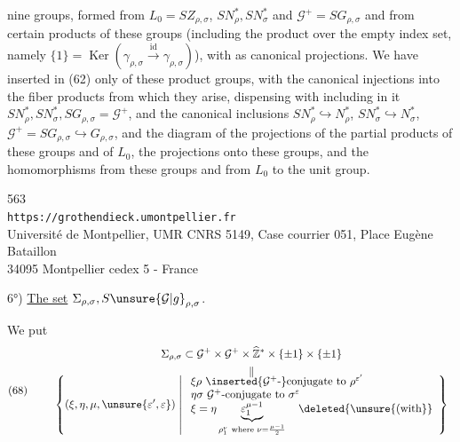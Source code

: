 
nine groups,  formed from $L_{0}=SZ_{\rho,\sigma}$, $SN_{\rho}^{*},SN_{\sigma}^{*}$ and $\mathcal{G}^{+}=SG_{\rho,\sigma}$ and from certain products of these groups (including the product over the empty index set, namely $\{1\}=\operatorname{Ker}(\gamma_{\rho,\sigma}\xrightarrow{\mathrm{id}}\gamma_{\rho,\sigma})$), with as  canonical projections. We have inserted in (62) only  of these product groups, with the canonical injections into the fiber products from which they arise,  dispensing with including in it  $SN_{\rho}^{*},SN_{\sigma}^{*},SG_{\rho,\sigma}=\mathcal{G}^{+}$, and the canonical inclusions $SN_{\rho}^{*}\hookrightarrow N_{\rho}^{*}$, $SN_{\sigma}^{*}\hookrightarrow N_{\sigma}^{*}$, $\mathcal{G}^{+}=SG_{\rho,\sigma}\hookrightarrow G_{\rho,\sigma}$, and the   diagram of the projections of the partial products of these groups and of $L_{0}$,   the projections onto these  groups, and the homomorphisms from these groups and from $L_{0}$ to the unit group.


{\small
\begin{center}
563\\
\texttt{https://grothendieck.umontpellier.fr}\\
Université de Montpellier, UMR CNRS 5149, Case courrier 051, Place Eugène Bataillon\\
34095 Montpellier cedex 5 - France
\end{center}
}


6°) \uline{The set} $\Sigma_{\rho,\sigma},S\unsure{\mathcal{G}|g}_{\rho,\sigma}$.

We put
\[
\text{(68)}\qquad
\begin{gathered}
\Sigma_{\rho,\sigma}\subset\mathcal{G}^{+}\times\mathcal{G}^{+}\times\widehat{\mathbb Z}^{*}\times\{\pm1\}\times\{\pm1\}\\
\begin{array}{c}
\Vert\\[-0.4em]
\displaystyle
\left\{(\xi,\eta,\mu,\unsure{\varepsilon',\varepsilon})\;\middle|\;
\begin{array}{l}
\xi\rho\ \inserted{\mathcal{G}^{+}\text{-}}\text{conjugate to }\rho^{\varepsilon'}\\
\eta\sigma\ \mathcal{G}^{+}\text{-conjugate to }\sigma^{\varepsilon}\\
\xi=\eta\underbrace{\varepsilon_{1}^{\mu-1}}_{\rho_{1}^{\nu}\ \text{where }\nu=\frac{\mu-1}{2}}\quad\deleted{\unsure{\text{(with}}}
\end{array}\right\}
\end{array}
\end{gathered}
\]


